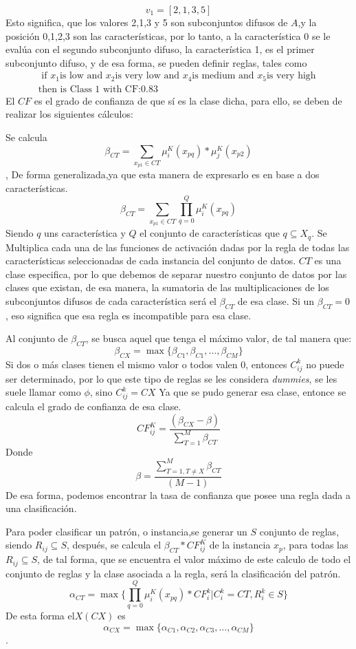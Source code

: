 \documentclass{article}
\begin{document}
\[ v_1 =[2,1,3,5]   \]
Esto significa, que los valores 2,1,3 y 5 son subconjuntos difusos de \(A\),y  la posición 0,1,2,3 son las características, por lo tanto, a la característica 0 se le evalúa con el segundo subconjunto difuso, la característica 1, es el primer subconjunto difuso, y de esa forma, se pueden definir reglas, tales como
\begin{equation*}
    \begin{split}
        \text{ if } x_1 \text{is low and }  x_2 \text{is very low and } x_4 \text{is medium and } x_5 \text{is very high } \\
        \text{then is Class 1 with CF:} 0.83
    \end{split}
\end{equation*}
El \(CF\) es el grado de confianza de que sí es la clase dicha, para ello, se deben de realizar los siguientes cálculos:


Se calcula \[\beta_{CT}=\sum_{x_{p1}\in CT} \mu_i^K(x_{pq})*\mu_j^K(x_{p2})\], De forma generalizada,ya que esta manera de expresarlo es en base a dos características.
\[\beta_{CT}=\sum_{x_{p1}\in CT} \prod_{q=0}^{Q}\mu_i^K(x_{pq})\]
Siendo \(q\) uns característica y \(Q\) el conjunto de características que \(q\subseteq X_q\).
Se Multiplica cada una de las funciones de activación dadas por la regla de todas las características seleccionadas de cada instancia del conjunto de datos. \(CT\) es una clase especifica, por lo que debemos de separar nuestro conjunto de datos por las clases que existan, de esa manera, la sumatoria de las multiplicaciones de los subconjuntos difusos de cada característica será el \(\beta_{CT}\) de esa clase.
Si un \(\beta_{CT}=0\), eso significa que esa regla es incompatible para esa clase.

Al conjunto de \(\beta_{CT}\), se busca aquel que tenga el máximo valor, de tal manera que:
\[\beta_{CX}=\max\{\beta_{C1},\beta_{C1},\dots,\beta_{CM}\}\]
Si dos o más clases tienen el mismo valor o todos valen 0, entonces \(C^k_{ij}\) no puede ser determinado, por lo que este tipo de reglas se les considera \textit{dummies}, se les suele llamar como \(\phi\), sino \(C^k_{ij}=CX\)
Ya que se pudo generar esa clase, entonce se calcula el grado de confianza de esa clase.
\[CF^K_{ij}=\frac{(\beta_{CX}-\beta)}{\sum_{T=1}^{M}\beta_{CT}}\]
Donde \[\beta=\frac{\sum_{T=1,T\neq X}^{M}\beta_{CT}}{(M-1)}\]
De esa forma, podemos encontrar la tasa de confianza que posee una regla dada a una clasificación.

Para poder clasificar un patrón, o instancia,se generar un \(S\) conjunto de reglas, siendo \(R_{ij} \subseteq S\), después, se calcula  el \(\beta_{CT}*CF^K_{ij}\) de la instancia \(x_p\), para todas las \(R_{ij}  \subseteq S\), de tal forma, que se encuentra el valor máximo de este calculo de todo el conjunto de reglas y la clase asociada a la regla, será la clasificación del patrón.
\[\alpha_{CT}=\max\{\prod_{q=0}^{Q}\mu^K_{i}(x_{pq})*CF^k_{i}|C^k_{i}=CT,R^k_i \in S\}\]
De esta forma el\(X(CX)\) es 
\[\alpha_{CX}=\max\{\alpha_{C1},\alpha_{C2},\alpha_{C3},\dots,\alpha_{CM}\}\].
\end{document}
